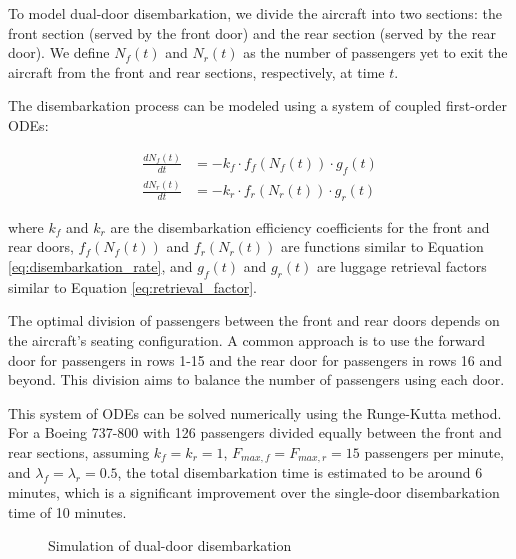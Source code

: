 To model dual-door disembarkation, we divide the aircraft into two sections: the front section (served by the front door) and the rear section (served by the rear door). We define $N_f(t)$ and $N_r(t)$ as the number of passengers yet to exit the aircraft from the front and rear sections, respectively, at time $t$.

The disembarkation process can be modeled using a system of coupled first-order ODEs:

\begin{align}
\frac{dN_f(t)}{dt} &= -k_f \cdot f_f(N_f(t)) \cdot g_f(t) \\
\frac{dN_r(t)}{dt} &= -k_r \cdot f_r(N_r(t)) \cdot g_r(t)
\label{eq:dual_door}
\end{align}

where $k_f$ and $k_r$ are the disembarkation efficiency coefficients for the front and rear doors, $f_f(N_f(t))$ and $f_r(N_r(t))$ are functions similar to Equation \ref{eq:disembarkation_rate}, and $g_f(t)$ and $g_r(t)$ are luggage retrieval factors similar to Equation \ref{eq:retrieval_factor}.

The optimal division of passengers between the front and rear doors depends on the aircraft's seating configuration. A common approach is to use the forward door for passengers in rows 1-15 and the rear door for passengers in rows 16 and beyond. This division aims to balance the number of passengers using each door.

This system of ODEs can be solved numerically using the Runge-Kutta method. For a Boeing 737-800 with 126 passengers divided equally between the front and rear sections, assuming $k_f = k_r = 1$, $F_{max,f} = F_{max,r} = 15$ passengers per minute, and $\lambda_f = \lambda_r = 0.5$, the total disembarkation time is estimated to be around 6 minutes, which is a significant improvement over the single-door disembarkation time of 10 minutes.

\begin{figure}[H]
\centering
{}
\caption{Simulation of dual-door disembarkation}
\label{fig:dual_door}
\end{figure}


